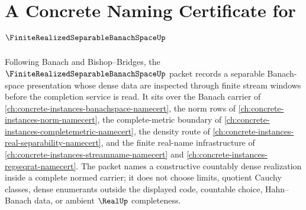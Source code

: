 \chapter{A Concrete Naming Certificate for $\FiniteRealizedSeparableBanachSpaceUp$}
\label{ch:concrete-instances-finite-realized-separable-banach-space-namecert}

Following Banach and Bishop--Bridges, the $\FiniteRealizedSeparableBanachSpaceUp$ packet records a separable Banach-space presentation whose dense data are inspected through finite stream windows before the completion service is read. It sits over the Banach carrier of \autoref{ch:concrete-instances-banachspace-namecert}, the norm rows of \autoref{ch:concrete-instances-norm-namecert}, the complete-metric boundary of \autoref{ch:concrete-instances-completemetric-namecert}, the density route of \autoref{ch:concrete-instances-real-separability-namecert}, and the finite real-name infrastructure of \autoref{ch:concrete-instances-streamname-namecert} and \autoref{ch:concrete-instances-regseqrat-namecert}. The packet names a constructive countably dense realization inside a complete normed carrier; it does not choose limits, quotient Cauchy classes, dense enumerants outside the displayed code, countable choice, Hahn--Banach data, or ambient $\RealUp$ completeness.

